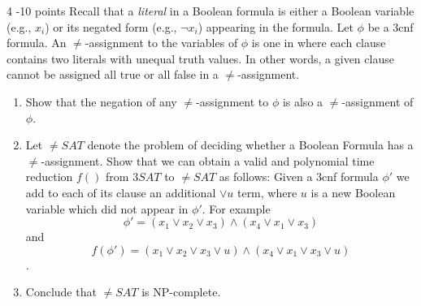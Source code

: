 \documentclass{common/cs157}
\begin{document}
\begin{problem}{4 -10 points}
Recall that a \emph{literal} in a Boolean formula is either a Boolean variable (e.g., $x_i$) or its negated form (e.g., $\neg x_i$) appearing in the formula. Let $\phi$ be a 3cnf formula. An $\neq$-assignment to the variables of $\phi$ is one in where each clause contains two literals with unequal truth values. In other words, a given clause cannot be assigned all true or all false in a $\neq$-assignment.
\begin{enumerate}
    \item Show that the negation of any $\neq$-assignment to $\phi$ is also a $\neq$-assignment of $\phi$.
    \item Let $\neq SAT$ denote the problem of deciding whether a Boolean Formula has a $\neq$-assignment. Show that we can obtain a valid and polynomial time reduction $f()$ from $3SAT$ to  $\neq SAT$ as follows: Given a 3cnf formula $\phi'$ we add to each of its clause an additional $\vee u$ term, where $u$ is a new Boolean variable which did not appear in $\phi'$. For example 
    $$\phi'=(x_1\vee x_2 \vee x_3)\wedge (x_4\vee x_1\vee x_3)$$
    and 
    $$f(\phi')= (x_1\vee x_2 \vee x_3\vee u)\wedge (x_4\vee x_1\vee x_3\vee u)$$.
    \item Conclude that $\neq SAT$ is NP-complete.
\end{enumerate}
 \end{problem}
\end{document}
